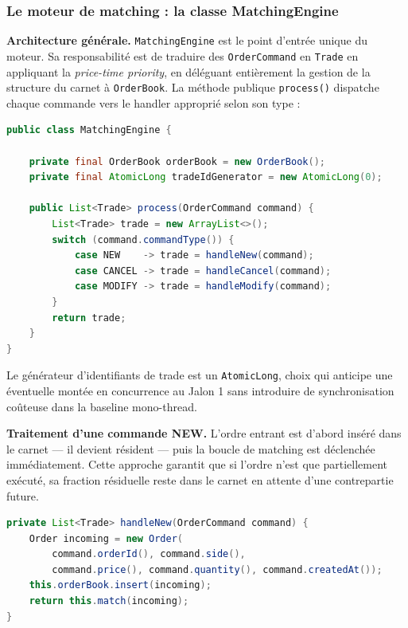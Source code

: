 \subsubsection{Le moteur de matching : la classe MatchingEngine}

\textbf{Architecture générale.} \texttt{MatchingEngine} est le point d'entrée unique du moteur. Sa responsabilité est de traduire des \texttt{OrderCommand} en \texttt{Trade} en appliquant la \textit{price-time priority}, en déléguant entièrement la gestion de la structure du carnet à \texttt{OrderBook}. La méthode publique \texttt{process()} dispatche chaque commande vers le handler approprié selon son type :

\begin{lstlisting}[language=Java, caption={Point d'entrée unique du moteur de matching}]
public class MatchingEngine {

    private final OrderBook orderBook = new OrderBook();
    private final AtomicLong tradeIdGenerator = new AtomicLong(0);

    public List<Trade> process(OrderCommand command) {
        List<Trade> trade = new ArrayList<>();
        switch (command.commandType()) {
            case NEW    -> trade = handleNew(command);
            case CANCEL -> trade = handleCancel(command);
            case MODIFY -> trade = handleModify(command);
        }
        return trade;
    }
}
\end{lstlisting}

Le générateur d'identifiants de trade est un \texttt{AtomicLong}, choix qui anticipe une éventuelle montée en concurrence au Jalon 1 sans introduire de synchronisation coûteuse dans la baseline mono-thread.

\textbf{Traitement d'une commande NEW.} L'ordre entrant est d'abord inséré dans le carnet — il devient résident — puis la boucle de matching est déclenchée immédiatement. Cette approche garantit que si l'ordre n'est que partiellement exécuté, sa fraction résiduelle reste dans le carnet en attente d'une contrepartie future.

\begin{lstlisting}[language=Java, caption={Traitement d'une commande NEW}]
private List<Trade> handleNew(OrderCommand command) {
    Order incoming = new Order(
        command.orderId(), command.side(),
        command.price(), command.quantity(), command.createdAt());
    this.orderBook.insert(incoming);
    return this.match(incoming);
}
\end{lstlisting}

